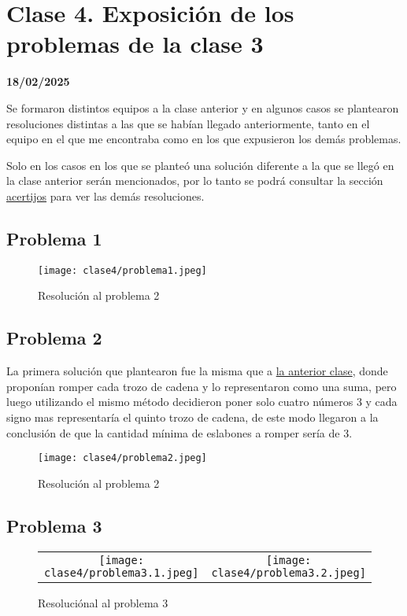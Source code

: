 \chapter{Clase 4. Exposición de los problemas de la clase 3}
\textbf{18/02/2025}

Se formaron distintos equipos a la clase anterior y en algunos casos se plantearon resoluciones distintas a las que se habían llegado anteriormente, tanto en el equipo en el que me encontraba como en los que expusieron los demás problemas. 

Solo en los casos en los que se planteó una solución diferente a la que se llegó en la clase anterior serán mencionados, por lo tanto se podrá consultar la sección \hyperref[sec:C3ACERTIJOS]{acertijos} para ver las demás resoluciones.

\section{Problema 1}
\begin{figure}[h!]
    \begin{center}
        \texttt{[image: clase4/problema1.jpeg]}
    \end{center}
    \caption{Resolución al problema 2}
\end{figure}

\section{Problema 2}
La primera solución que plantearon fue la misma que a \hyperref[ejem:c3P2]{la anterior clase}, donde proponían romper cada trozo de cadena y lo representaron como una suma, pero luego utilizando el mismo método decidieron poner solo cuatro números 3 y cada signo mas representaría el quinto trozo de cadena, de este modo llegaron a la conclusión de que la cantidad mínima de eslabones a romper sería de 3.
\begin{figure}[h!]
    \begin{center}
        \texttt{[image: clase4/problema2.jpeg]}
    \end{center}
    \caption{Resolución al problema 2}
\end{figure}

\section{Problema 3}
\begin{figure}[h!]
    \begin{center}
        \begin{tabular}{cc}
            \texttt{[image: clase4/problema3.1.jpeg]}&\texttt{[image: clase4/problema3.2.jpeg]}
        \end{tabular}
    \end{center}
    \caption{Resoluciónal al problema 3}
\end{figure}

